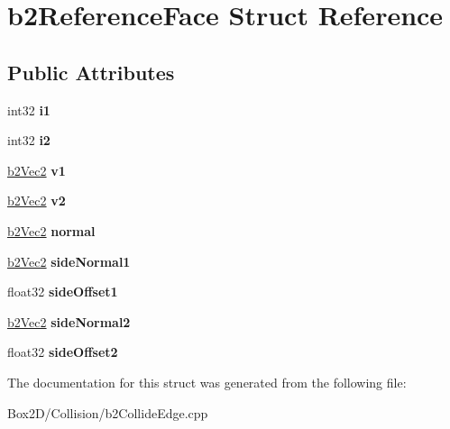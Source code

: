 \hypertarget{structb2_reference_face}{}\section{b2\+Reference\+Face Struct Reference}
\label{structb2_reference_face}
\subsection*{Public Attributes}
\begin{DoxyCompactItemize}
\item 
\mbox{\label{structb2_reference_face_a987d346858f5c1dd1de0dfddab779324}} 
int32 {\bfseries i1}
\item 
\mbox{\label{structb2_reference_face_a838ab3e4a81b71cfaa450eb214584353}} 
int32 {\bfseries i2}
\item 
\mbox{\label{structb2_reference_face_a20165b58f2e81b78ed3a099ef85737ac}} 
\hyperlink{structb2_vec2}{b2\+Vec2} {\bfseries v1}
\item 
\mbox{\label{structb2_reference_face_aa89eb5b51e9ee680b97c33041658f9ab}} 
\hyperlink{structb2_vec2}{b2\+Vec2} {\bfseries v2}
\item 
\mbox{\label{structb2_reference_face_a4ba73696920306d3c8fecc35a4433029}} 
\hyperlink{structb2_vec2}{b2\+Vec2} {\bfseries normal}
\item 
\mbox{\label{structb2_reference_face_a478026ee3fa0d8d1349b01928eb9e947}} 
\hyperlink{structb2_vec2}{b2\+Vec2} {\bfseries side\+Normal1}
\item 
\mbox{\label{structb2_reference_face_a7e2a902ed8f499fbb4305d51ce687876}} 
float32 {\bfseries side\+Offset1}
\item 
\mbox{\label{structb2_reference_face_ad272f9369fbc1d28f60f77defd757dbd}} 
\hyperlink{structb2_vec2}{b2\+Vec2} {\bfseries side\+Normal2}
\item 
\mbox{\label{structb2_reference_face_a7fa70d9f4bfc4cdf792408ffe204d017}} 
float32 {\bfseries side\+Offset2}
\end{DoxyCompactItemize}


The documentation for this struct was generated from the following file\+:\begin{DoxyCompactItemize}
\item 
Box2\+D/\+Collision/b2\+Collide\+Edge.\+cpp\end{DoxyCompactItemize}
